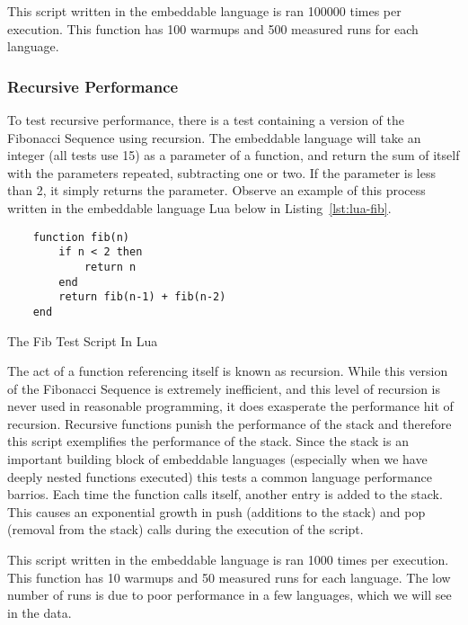 This script written in the embeddable language is ran 100000 times per execution. This function has 100 warmups and 500 measured runs for each language.

\subsubsection{Recursive Performance}
To test recursive performance, there is a test containing a version of the Fibonacci Sequence using recursion. The embeddable language will take an integer (all tests use 15) as a parameter of a function, and return the sum of itself with the parameters repeated, subtracting one or two. If the parameter is less than 2, it simply returns the parameter. Observe an example of this process written in the embeddable language Lua below in Listing~\ref{lst:lua-fib}.

\begin{listing}[H]
    \begin{verbatim}
    function fib(n)
        if n < 2 then
            return n
        end
        return fib(n-1) + fib(n-2)
    end
    \end{verbatim}
    \caption{The Fib Test Script In Lua}
    \label{lst:lua-fib}
\end{listing}

The act of a function referencing itself is known as recursion. While this version of the Fibonacci Sequence is extremely inefficient, and this level of recursion is never used in reasonable programming, it does exasperate the performance hit of recursion. Recursive functions punish the performance of the stack\cite{recursion:performance} and therefore this script exemplifies the performance of the stack. Since the stack is an important building block of embeddable languages (especially when we have deeply nested functions executed) this tests a common language performance barrios. Each time the function calls itself, another entry is added to the stack. This causes an exponential growth in push (additions to the stack) and pop (removal from the stack) calls during the execution of the script.

This script written in the embeddable language is ran 1000 times per execution. This function has 10 warmups and 50 measured runs for each language. The low number of runs is due to poor performance in a few languages, which we will see in the data.

